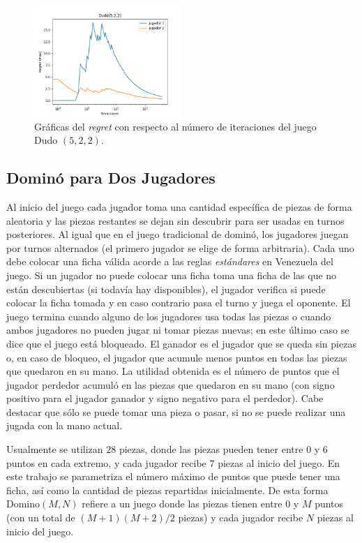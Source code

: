 \begin{figure}[h]
    \centering
    \includegraphics[width=0.5\textwidth]{graficas/cfr/dudo/Dudo(5,2,2).png}
    \caption{Gráficas del \textit{regret} con respecto al número de iteraciones del juego Dudo $(5, 2, 2)$.}
    \label{fig:cfr-regret-dudo-5-2-2}
\end{figure}

\subsection*{Dominó para Dos Jugadores}
Al inicio del juego cada jugador toma una cantidad específica de piezas de forma aleatoria y las piezas restantes se dejan sin descubrir para ser usadas en turnos posteriores. Al igual que en el juego tradicional de dominó, los jugadores juegan por turnos alternados (el primero jugador se elige de forma arbitraria). Cada uno debe colocar una ficha válida acorde a las reglas \textit{estándares} en Venezuela del juego. Si un jugador no puede colocar una ficha toma una ficha de las que no están descubiertas (si todavía hay disponibles), el jugador verifica si puede colocar la ficha tomada y en caso contrario pasa el turno y juega el oponente.
El juego termina cuando alguno de los jugadores usa todas las piezas o cuando ambos jugadores no pueden jugar ni tomar piezas nuevas; en este último caso se dice que el juego está bloqueado. El ganador es el jugador que se queda sin piezas o, en caso de bloqueo, el jugador que acumule menos puntos en todas las piezas que quedaron en su mano. La utilidad obtenida es el número de puntos que el jugador perdedor acumuló en las piezas que quedaron en su mano (con signo positivo para el jugador ganador y signo negativo para el perdedor). Cabe destacar que sólo se puede tomar una pieza o pasar, si no se puede realizar una jugada con la mano actual.

Usualmente se utilizan $28$ piezas, donde las piezas pueden tener entre $0$ y $6$ puntos en cada extremo, y cada jugador recibe $7$ piezas al inicio del juego. En este trabajo se parametriza el número máximo de puntos que puede tener una ficha, así como la cantidad de piezas repartidas inicialmente. De esta forma Domino$(M, N)$ refiere a un juego donde las piezas tienen entre $0$ y $M$ puntos (con un total de $(M+1)(M+2)/2$ piezas) y cada jugador recibe $N$ piezas al inicio del juego.

